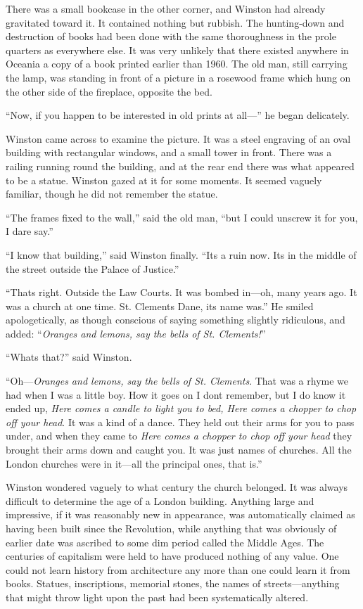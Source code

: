 There was a small bookcase in the other corner, and Winston had already
gravitated toward it. It contained nothing but rubbish. The hunting-down
and destruction of books had been done with the same thoroughness in the
prole quarters as everywhere else. It was very unlikely that there
existed anywhere in Oceania a copy of a book printed earlier than 1960.
The old man, still carrying the lamp, was standing in front of a picture
in a rosewood frame which hung on the other side of the fireplace,
opposite the bed.

``Now, if you happen to be interested in old prints at all---'' he began
delicately.

Winston came across to examine the picture. It was a steel engraving of
an oval building with rectangular windows, and a small tower in front.
There was a railing running round the building, and at the rear end
there was what appeared to be a statue. Winston gazed at it for some
moments. It seemed vaguely familiar, though he did not remember the
statue.

``The frame\textquotesingle s fixed to the wall,'' said the old man, ``but
I could unscrew it for you, I dare say.''

``I know that building,'' said Winston finally. ``It\textquotesingle s a
ruin now. It\textquotesingle s in the middle of the street outside the
Palace of Justice.''

``That\textquotesingle s right. Outside the Law Courts. It was bombed
in---oh, many years ago. It was a church at one time. St.
Clement\textquotesingle s Dane, its name was.'' He smiled apologetically,
as though conscious of saying something slightly ridiculous, and added:
``\emph{Oranges and lemons, say the bells of St.
Clement\textquotesingle s!}''

``What\textquotesingle s that?'' said Winston.

``Oh---\emph{Oranges and lemons, say the bells of St.
Clement\textquotesingle s}. That was a rhyme we had when I was a little
boy. How it goes on I don\textquotesingle t remember, but I do know it
ended up, \emph{Here comes a candle to light you to bed, Here comes a
chopper to chop off your head}. It was a kind of a dance. They held out
their arms for you to pass under, and when they came to \emph{Here comes
a chopper to chop off your head} they brought their arms down and caught
you. It was just names of churches. All the London churches were in
it---all the principal ones, that is.''

Winston wondered vaguely to what century the church belonged. It was
always difficult to determine the age of a London building. Anything
large and impressive, if it was reasonably new in appearance, was
automatically claimed as having been built since the Revolution, while
anything that was obviously of earlier date was ascribed to some dim
period called the Middle Ages. The centuries of capitalism were held to
have produced nothing of any value. One could not learn history from
architecture any more than one could learn it from books. Statues,
inscriptions, memorial stones, the names of streets---anything that
might throw light upon the past had been systematically altered.

